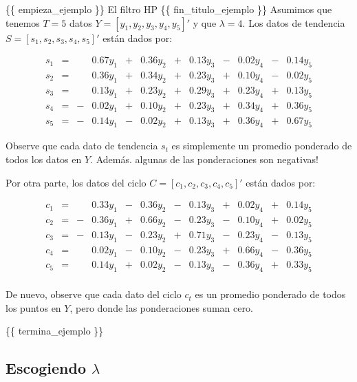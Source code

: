 \documentclass[11pt]{article}
\begin{document}
\{\{ empieza\_ejemplo \}\} El filtro HP \{\{ fin\_titulo\_ejemplo \}\}
Asumimos que tenemos \(T=5\) datos
\(Y=\left[y_1,y_2,y_3,y_4,y_5\right]'\) y que \(\lambda=4\). Los datos
de tendencia \(S=\left[s_1,s_2,s_3,s_4,s_5\right]'\) están dados por:

\begin{align*}
 s_1 &= & &0.67y_1 &+ & 0.36y_2 &+ & 0.13y_3 &- & 0.02y_4 &- & 0.14y_5 \\
 s_2 &= & &0.36y_1 &+ & 0.34y_2 &+ & 0.23y_3 &+ & 0.10y_4 &- & 0.02y_5 \\
 s_3 &= & &0.13y_1 &+ & 0.23y_2 &+ & 0.29y_3 &+ & 0.23y_4 &+ & 0.13y_5 \\
 s_4 &= &-&0.02y_1 &+ & 0.10y_2 &+ & 0.23y_3 &+ & 0.34y_4 &+ & 0.36y_5 \\
 s_5 &= &-&0.14y_1 &- & 0.02y_2 &+ & 0.13y_3 &+ & 0.36y_4 &+ & 0.67y_5
\end{align*}

Observe que cada dato de tendencia \(s_t\) es simplemente un promedio
ponderado de todos los datos en \(Y\). Además. algunas de las
ponderaciones son negativas!

Por otra parte, los datos del ciclo
\(C=\left[c_1,c_2,c_3,c_4,c_5\right]'\) están dados por:

\begin{align*}
c_1 &= & &0.33y_1 &- & 0.36y_2 &- & 0.13y_3 &+ & 0.02y_4 &+ & 0.14y_5 \\
c_2 &= &-&0.36y_1 &+ & 0.66y_2 &- & 0.23y_3 &- & 0.10y_4 &+ & 0.02y_5 \\
c_3 &= &-&0.13y_1 &- & 0.23y_2 &+ & 0.71y_3 &- & 0.23y_4 &- & 0.13y_5 \\
c_4 &= & &0.02y_1 &- & 0.10y_2 &- & 0.23y_3 &+ & 0.66y_4 &- & 0.36y_5 \\
c_5 &= & &0.14y_1 &+ & 0.02y_2 &- & 0.13y_3 &- & 0.36y_4 &+ & 0.33y_5 \\
\end{align*}

De nuevo, observe que cada dato del ciclo \(c_t\) es un promedio
ponderado de todos los puntos en \(Y\), pero donde las ponderaciones
suman cero.

\{\{ termina\_ejemplo \}\}

\hypertarget{escogiendo-lambda}{%
\subsection{\texorpdfstring{Escogiendo
\(\lambda\)}{Escogiendo \textbackslash lambda}}\label{escogiendo-lambda}}
\end{document}

